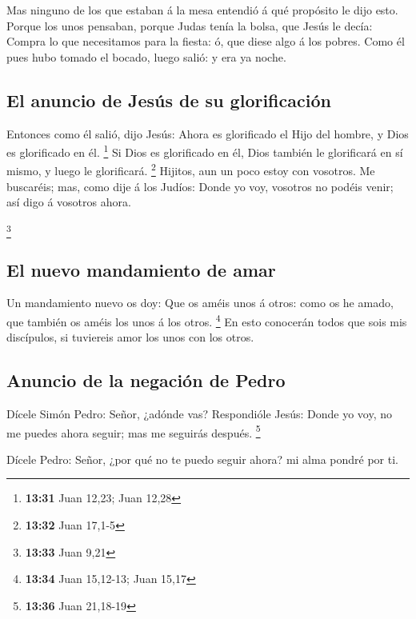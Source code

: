  Mas ninguno de los que estaban á la mesa entendió á qué
propósito le dijo esto.  Porque los unos pensaban, porque
Judas tenía la bolsa, que Jesús le decía: Compra lo que necesitamos para
la fiesta: ó, que diese algo á los pobres.  Como él pues
hubo tomado el bocado, luego salió: y era ya noche.

\hypertarget{el-anuncio-de-jesuxfas-de-su-glorificaciuxf3n}{%
\subsection{El anuncio de Jesús de su
glorificación}\label{el-anuncio-de-jesuxfas-de-su-glorificaciuxf3n}}

 Entonces como él salió, dijo Jesús: Ahora es glorificado
el Hijo del hombre, y Dios es glorificado en él. \footnote{\textbf{13:31}
  Juan 12,23; Juan 12,28}  Si Dios es glorificado en él,
Dios también le glorificará en sí mismo, y luego le glorificará.
\footnote{\textbf{13:32} Juan 17,1-5}  Hijitos, aun un poco
estoy con vosotros. Me buscaréis; mas, como dije á los Judíos: Donde yo
voy, vosotros no podéis venir; así digo á vosotros ahora.

\footnote{\textbf{13:33} Juan 9,21}

\hypertarget{el-nuevo-mandamiento-de-amar}{%
\subsection{El nuevo mandamiento de
amar}\label{el-nuevo-mandamiento-de-amar}}

 Un mandamiento nuevo os doy: Que os améis unos á otros:
como os he amado, que también os améis los unos á los otros. \footnote{\textbf{13:34}
  Juan 15,12-13; Juan 15,17}  En esto conocerán todos que
sois mis discípulos, si tuviereis amor los unos con los otros.

\hypertarget{anuncio-de-la-negaciuxf3n-de-pedro}{%
\subsection{Anuncio de la negación de
Pedro}\label{anuncio-de-la-negaciuxf3n-de-pedro}}

 Dícele Simón Pedro: Señor, ¿adónde vas? Respondióle Jesús:
Donde yo voy, no me puedes ahora seguir; mas me seguirás después.
\footnote{\textbf{13:36} Juan 21,18-19}

 Dícele Pedro: Señor, ¿por qué no te puedo seguir ahora? mi
alma pondré por ti.

